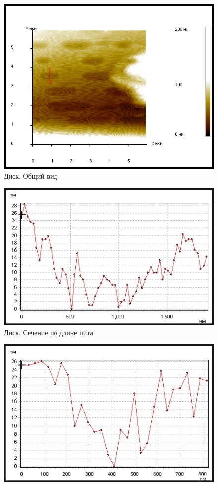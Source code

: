 \documentclass[a4paper,12pt]{article}
\theoremstyle{plain} %
\theoremstyle{definition} %
\theoremstyle{remark} %
\begin{document}
\begin{itemize}
\begin{enumerate}
\begin{figure}[h!]
	\centering
	\includegraphics[scale=1]{pic106.jpg}
	\caption{Диск. Общий вид}
	\label{pшс}
\end{figure}
\begin{figure}[h!]
	\centering
	\includegraphics[scale=1.1]{pic104.jpg}
	\caption{Диск. Сечение по длине пита}
	\label{pшс}
\end{figure}
\begin{figure}[h!]
	\centering
	\includegraphics[scale=1.1]{pic105.jpg}

\end{figure}
\end{enumerate}
\end{itemize}
\end{document}
